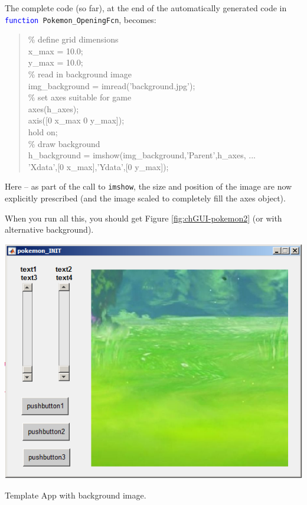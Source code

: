 \documentclass{tufte-book} %
\newenvironment{docspec}{\begin{quotation}\ttfamily\parskip0pt\parindent0pt\ignorespaces}{\end{quotation}}
\begin{document}
The complete code (so far), at the end of the automatically generated code in \texttt{\textcolor{blue}{function} Pokemon\_OpeningFcn}, becomes:
\begin{docspec}
\textcolor[rgb]{0,0.501961,0}{\% define grid dimensions}
\\x\_max = 10.0;
\\y\_max = 10.0;
\\\textcolor[rgb]{0,0.501961,0}{\% read in background image}
\\img\_background = imread(\textcolor[rgb]{0.501961,0,1}{'background.jpg'});
\\\textcolor[rgb]{0,0.501961,0}{\% set axes suitable for game}
\\axes(h\_axes);
\\axis([0 x\_max 0 y\_max]);
\\hold \textcolor[rgb]{0.501961,0,1}{on};
\\\textcolor[rgb]{0,0.501961,0}{\% draw background}
\\h\_background = imshow(img\_background,\textcolor[rgb]{0.501961,0,1}{'Parent'},h\_axes, ...
\\'Xdata',[0 x\_max],'Ydata',[0 y\_max]);
\end{docspec}
Here -- as part of the call to \texttt{imshow}, the size and position of the image are now explicitly prescribed (and the image scaled to completely fill the \textsf{axes} object).

When you run all this, you should get Figure \ref{fig:chGUI-pokemon2} (or with alternative background). 

\begin{marginfigure}[0.0in]
\includegraphics[width=\linewidth]{chGUI-pokemon2.png}
\caption{Template App with background image.}
\label{fig:chGUI-pokemon2}
\end{marginfigure}
\end{document}
